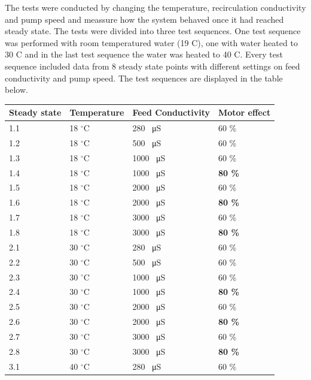 The tests were conducted by changing the temperature, recirculation conductivity and pump speed and meassure how the system behaved once it had reached steady state. The tests were divided into three test sequences. One test sequence was performed with room temperatured water (19 C), one with water heated to 30 C and in the last test sequence the water was heated to 40 C. Every test sequence included data from 8 steady state points with different settings on feed conductivity and pump speed. The test sequences are displayed in the table below. 

\begin{table}[h]
\centering
\begin{tabular}{|p{1.4cm}||p{2cm}|p{3.2cm}|p{1.8cm}|}
 \hline
 \textbf{Steady state }&Temperature&Feed Conductivity&Motor effect \\
 \hline
 1.1 & 18 $^\circ$C   & 280 \SI{}{\micro\siemens} & 60 \% \\
 1.2   &  18 $^\circ$C   & 500 \SI{}{\micro\siemens} & 60 \% \\
 1.3 &  18 $^\circ$C  &1000 \SI{}{\micro\siemens} & 60 \% \\
 1.4 &  18 $^\circ$C  &1000 \SI{}{\micro\siemens} & \textbf{80 \%} \\
 1.5 &18 $^\circ$C &2000 \SI{}{\micro\siemens}& 60 \%\\
 1.6 &18 $^\circ$C  &2000 \SI{}{\micro\siemens}& \textbf{80 \%}\\
 1.7   &18 $^\circ$C & 3000 \SI{}{\micro\siemens}&60 \% \\
 1.8   &18 $^\circ$C&3000 \SI{}{\micro\siemens}& \textbf{80 \%}\\
 \hline
 2.1 & 30 $^\circ$C & 280 \SI{}{\micro\siemens}&60 \%\\
 2.2 & 30 $^\circ$C &500 \SI{}{\micro\siemens}& 60 \%\\
 2.3 & 30 $^\circ$C&1000 \SI{}{\micro\siemens}& 60 \%\\
 2.4 & 30 $^\circ$C&1000 \SI{}{\micro\siemens}& \textbf{80 \%}\\
 2.5 & 30 $^\circ$C&2000 \SI{}{\micro\siemens}& 60 \%\\
 2.6 & 30 $^\circ$C&2000 \SI{}{\micro\siemens}& \textbf{80 \%}\\
 2.7 & 30 $^\circ$C& 3000 \SI{}{\micro\siemens}&60 \%\\
 2.8 & 30 $^\circ$C& 3000 \SI{}{\micro\siemens}&\textbf{80 \%}\\
 \hline 
 3.1 & 40 $^\circ$C& 280 \SI{}{\micro\siemens}& 60 \%\\

\end{tabular}
\end{table}
